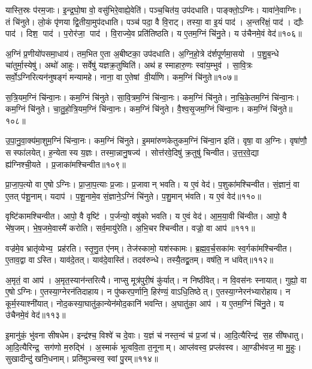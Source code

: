 यास्ति॒स्रः प॑रम॒जाः। इ॒न्द्र॒घो॒षा वो॒ वसु॑भिरे॒वाह्ये॒वेति॑। 
पञ्च॒चित॑य॒ उप॑दधाति। पाङ्क्तो॒ऽग्निः। 
यावा॑ने॒वाग्निः। तं चि॑नुते। 
लो॒कं पृ॑णया द्वि॒तीया॒मुप॑दधाति। पञ्च॑ पदा॒ वै वि॒राट्‌। 
तस्या॒ वा इ॒यं पाद॑। अ॒न्तरि॑क्षं॒ पाद॑। द्यौः पाद॑। 
दिश॒ पाद॑। प॒रोर॑जा॒ पाद॑। वि॒राज्ये॒व प्रति॑तिष्ठति। 
य ए॒तम॒ग्निं चि॑नु॒ते। य उ॑चैनमे॒वं वेद॑॥१०६॥\anuvakamend


अ॒ग्निं प्र॒णीयो॑पसमा॒धाय॑। तम॒भित ए॒ता अ॒बीष्टका॒ उप॑दधाति। 
अ॒ग्नि॒हो॒त्रे द॑र्शपूर्णमा॒सयो। प॒शु॒ब॒न्धे चा॑तुर्मा॒स्येषु॑। 
अथो॑ आहुः। सर्वेषु॑ यज्ञक्र॒तुष्विति॑। 
अथ॑ ह स्माहारु॒णः स्वा॑य॒म्भुव॑। सा॒वि॒त्रः सर्वो॒ऽग्निरित्यन॑नुषङ्गं मन्यामहे। 
नाना॒ वा ए॒तेषां वी॒र्या॑णि। कम॒ग्निं चि॑नुते॥१०७॥


स॒त्रि॒यम॒ग्निं चि॑न्वा॒नः। कम॒ग्निं चि॑नुते। 
सा॒वि॒त्रम॒ग्निं चि॑न्वा॒नः। कम॒ग्निं चि॑नुते। 
ना॒चि॒के॒तम॒ग्निं चि॑न्वा॒नः। कम॒ग्निं चि॑नुते। 
चा॒तु॒\ar{}हो॒त्रि॒य\-म॒ग्निं चि॑न्वा॒नः। कम॒ग्निं चि॑नुते। 
वै॒श्व॒सृ॒जम॒ग्निं चि॑न्वा॒नः। कम॒ग्निं चि॑नुते॥१०८॥


उ॒पा॒नु॒वा॒क्य॑मा॒शुम॒ग्निं चि॑न्वा॒नः। कम॒ग्निं चि॑नुते। 
इ॒ममा॑रुणकेतुक\-म॒ग्निं चि॑न्वा॒न इति॑। वृषा॒ वा अ॒ग्निः। 
वृषा॑णौ॒ सस्फा॑लयेत्‌। ह॒न्येतास्य य॒ज्ञः। 
तस्मा॒न्नानु॒षज्य॑। सोत्त॑रवे॒दिषु॑ क्र॒तुषु॑ चिन्वीत। 
उ॒त्त॒र॒वे॒द्या ह्य॑ग्निश्ची॒यते। प्र॒जाका॑मश्चिन्वीत॥१०९॥


प्रा॒जा॒प॒त्यो वा ए॒षोऽग्निः। प्रा॒जा॒प॒त्याः प्र॒जाः। 
प्र॒जावान्‌ भवति। य ए॒वं वेद॑। 
प॒शुका॑मश्चिन्वीत। सं॒ज्ञानं॒ वा ए॒तत्‌ प॑शू॒नाम्‌। 
यदाप॑। प॒शू॒नामे॒व सं॒ज्ञाने॒ऽग्निं चि॑नुते। 
प॒शु॒मान् भ॑वति। य ए॒वं वेद॑॥११०॥


वृष्टि॑कामश्चिन्वीत। आपो॒ वै वृष्टि॑। 
प॒र्जन्यो॒ व\ur{}षु॑को भवति। य ए॒वं वेद॑। 
आ॒म॒या॒वी चि॑न्वीत। आपो॒ वै भे॑ष॒जम्‌। 
भे॒ष॒जमे॒वास्मै॑ करोति। सर्व॒मायु॑रेति। 
अ॒भि॒चरश्चिन्वीत। वज्रो॒ वा आप॑॥१११॥


वज्र॑मे॒व भ्रातृ॑व्येभ्य॒ प्रह॑रति। स्तृ॒णु॒त ए॑नम्‌। 
तेज॑स्कामो॒ यश॑स्कामः। ब्र॒ह्म॒व॒र्च॒सका॑मः स्व॒र्गका॑मश्चिन्वीत। 
ए॒ताव॒द्वा वाऽस्ति। याव॑दे॒तत्‌। 
याव॑दे॒वास्ति॑। तदव॑रुन्धे। 
तस्यै॒तद्व्र॒तम्‌। व\ur{}ष॑ति॒ न धा॑वेत्‌॥११२॥


अ॒मृतं॒ वा आप॑। अ॒मृत॒स्यान॑न्तरित्यै। 
नाप्सु मूत्र॑पुरी॒षं कु॑र्यात्‌। न निष्ठी॑वेत्‌। 
न वि॒वस॑नः स्नायात्‌। गुह्यो॒ वा ए॒षोऽग्निः। 
ए॒तस्या॒ग्नेरन॑तिदाहाय। न पु॑ष्करप॒र्णानि॒ हिर॑ण्यं॒ वाऽधि॒तिष्ठेत्‌। 
ए॒तस्या॒ग्नेरन॑भ्यारोहाय। न कूर्म॒स्याश्नी॑यात्‌। 
नोद॒कस्या॒घातु॑का॒न्येन॑\-मोद॒कानि॑ भवन्ति। अ॒घातु॑का॒ आप॑। 
य ए॒तम॒ग्निं चि॑नु॒ते। य उ॑चैनमे॒वं वेद॑॥११३॥\anuvakamend


इ॒मानु॑कं॒ भु॑वना सीषधेम। इन्द्र॑श्च॒ विश्वे॑ च दे॒वाः। 
य॒ज्ञं च॑ नस्त॒न्वं च॑ प्र॒जां च॑। आ॒दि॒त्यैरिन्द्र॑ स॒ह सी॑षधातु। 
आ॒दि॒त्यैरिन्द्र॒ सग॑णो म॒रुद्भि॑। अ॒स्माकं॑ भूत्ववि॒ता त॒नूनाम्‌। 
आप्ल॑वस्व॒ प्रप्ल॑वस्व। आ॒ण्डीभ॑वज॒ मा मु॒हुः। 
सुखादीन्दु॑खनि॒धनाम्‌। प्रति॑मुञ्चस्व॒ स्वां पु॒रम्‌॥११४॥


